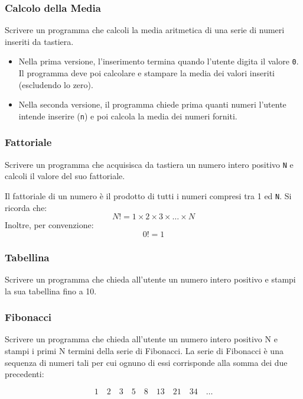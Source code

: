 \documentclass[a4paper,12pt]{article}
\begin{document}
	
	\subsubsection{Calcolo della Media}
	Scrivere un programma che calcoli la media aritmetica di una serie di numeri inseriti da tastiera.
	
	\begin{itemize}
		\item Nella prima versione, l'inserimento termina quando l'utente digita il valore \texttt{0}. Il programma deve poi calcolare e stampare la media dei valori inseriti (escludendo lo zero).
		\item Nella seconda versione, il programma chiede prima quanti numeri l'utente intende inserire (\texttt{n}) e poi calcola la media dei numeri forniti.
	\end{itemize}
	
	
	\subsubsection{Fattoriale}
	Scrivere un programma che acquisisca da tastiera un numero intero positivo \texttt{N} e calcoli il valore del suo fattoriale.
	
	Il fattoriale di un numero è il prodotto di tutti i numeri compresi tra 1 ed \texttt{N}.  
	Si ricorda che:
	\[
	N! = 1 \times 2 \times 3 \times \dots \times N
	\]
	Inoltre, per convenzione:
	\[
	0! = 1
	\]
	
	\subsubsection{Tabellina}
	Scrivere un programma che chieda all'utente un numero intero positivo e stampi la sua tabellina fino a 10.
	
	
	\subsubsection{Fibonacci}
	Scrivere un programma che chieda all'utente un numero intero positivo N e stampi i primi N termini della serie di Fibonacci.
	La serie di Fibonacci è una sequenza di numeri tali per cui ognuno di essi corrisponde alla somma dei due precedenti:
	
	\[
	1 \quad 2 \quad 3 \quad 5 \quad 8 \quad 13 \quad 21 \quad 34 \quad \dots
	\]
	
	
	
	
	
	
	
	
	
\end{document}

